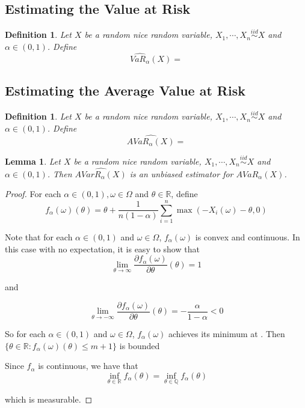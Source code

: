 \documentclass[12pt]{amsart}
\newtheorem{lem}[thm]{Lemma}
\newtheorem{defn}[thm]{Definition}
\newcommand{\al}{\alpha}
\newcommand{\om}{\omega}
\newcommand{\Om}{\Omega}
\newcommand{\R}{\mathbb{R}}
\newcommand{\Q}{\mathbb{Q}}
\begin{document}
\subsection{Estimating the Value at Risk}

\begin{defn}
Let $X$ be a random nice random variable, $X_1, \cdots , X_n \stackrel{iid}{\sim} X$ and $\al\in (0,1)$. Define $$\widehat{VaR_\al}(X) = $$
\end{defn}

\subsection{Estimating the Average Value at Risk}

\begin{defn}
Let $X$ be a random nice random variable, $X_1, \cdots , X_n \stackrel{iid}{\sim} X$ and $\al\in (0,1)$. Define $$ \widehat{AVaR_{\al}(X)} = $$ 
\end{defn}

\begin{lem}
Let $X$ be a random nice random variable, $X_1, \cdots , X_n \stackrel{iid}{\sim} X$ and $\al\in (0,1)$. Then $\widehat{AVarR_{\al}(X)}$ is an unbiased estimator for $AVaR_{\al}(X)$. 
\end{lem}

\begin{proof}
For each $\al\in (0,1), \om \in \Om$ and $\theta \in \R$, define $$f_{\al}(\om)(\theta) = \theta + \frac{1}{n (1-\al)} \sum_{i=1}^n\max(-X_i(\om) - \theta, 0) $$ 

Note that for each $\al\in (0,1)$ and $\om \in \Om$, $f_{\al}(\om)$ is convex and continuous. In this case with no expectation, it is easy to show that $$\lim_{\theta \rightarrow \infty}\frac{\partial f_{\al}(\om)}{\partial \theta}(\theta) = 1$$

and
 
$$\lim_{\theta \rightarrow -\infty}\frac{\partial f_{\al}(\om)}{\partial \theta}(\theta) = -\frac{\al}{1-\al} <0$$  

So for each $\al\in (0,1)$ and $\om \in \Om$, $f_{\al}(\om)$ achieves its minimum at . Then $\{\theta \in \R: f_{\al}(\om)(\theta)\leq m+1\}$ is bounded

Since $f_{\al}$ is continuous, we have that $$\inf_{\theta \in \R} f_{\al}(\theta) = \inf_{\theta \in \Q} f_{\al}(\theta)$$ 

which is measurable. 

\end{proof} 



\end{document}
